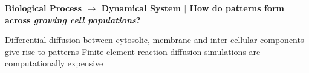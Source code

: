 \documentclass[a0,portrait]{a0poster}
\begin{document}
\begin{tcolorbox}[boxrule=2pt,arc=3.4pt,boxsep=2mm]
	\begin{center}
		\textbf{\color{Grey}Biological Process $\rightarrow$ Dynamical System \color{Black}$|$
		How do patterns form across \textit{growing cell populations}?}
	\end{center}
\end{tcolorbox}

\begin{itemize}[leftmargin=5cm]
	\up Differential diffusion between cytosolic, membrane and inter-cellular components give rise to patterns
	\down Finite element reaction-diffusion simulations are computationally expensive
\end{itemize}


\vfill\normalsize

\begin{minipage}[t][][b]{0.99\textwidth}
	
	
\end{minipage}
\end{document}
